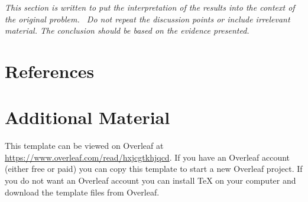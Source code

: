 \documentclass[11pt,a4paper,oneside]{report}
\newcommand{\instructions}[1]{{\color{black}\itshape #1}}
\begin{document}
\instructions{This section is written to put the interpretation of the results
into the context of the original problem.~ Do not repeat the discussion
points or include irrelevant material. The conclusion should be based on
the evidence presented.}


\chapter*{References}
\label{references}

\printbibliography[heading=none]



\appendix

\chapter{Additional Material}
\label{appendix-a}

This template can be viewed on Overleaf at \url{https://www.overleaf.com/read/hxjcgtkhjqcd}.
If you have an Overleaf account (either free or paid) you can copy this template to start a new Overleaf project.
If you do not want an Overleaf account you can install TeX on your computer and download the template files from Overleaf.
\end{document}
